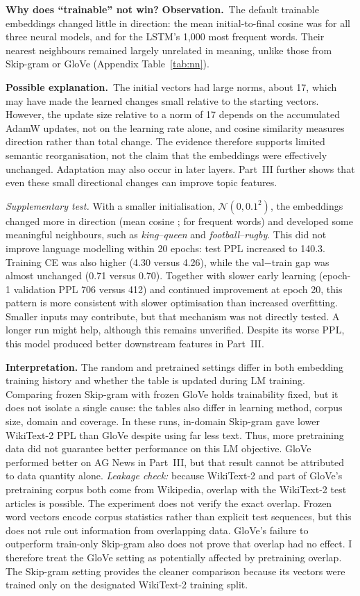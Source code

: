 \documentclass[10pt]{article}
\newcommand{\obs}{\textbf{Observation.}~}
\newcommand{\hyp}{\par\textbf{Possible explanation.}~}
\begin{document}
\textbf{Why does ``trainable'' not win?} \obs The default trainable embeddings changed little in direction: the mean
initial-to-final cosine was \driftlstm{} for all three neural models, and \drifttoplstm{} for the LSTM's 1,000 most
frequent words. Their nearest neighbours remained largely unrelated in meaning, unlike those from Skip-gram or GloVe
(Appendix Table~\ref{tab:nn}). \hyp The initial vectors had large norms, about 17, which may have made the learned
changes small relative to the starting vectors. However, the update size relative to a norm of 17 depends on the accumulated AdamW updates, not on the
learning rate alone, and cosine similarity measures direction rather than total change. The evidence therefore supports
limited semantic reorganisation, not the claim that the embeddings were effectively unchanged. Adaptation may also
occur in later layers. Part~III further shows that even these small directional changes can improve topic features.
\par\emph{Supplementary test.} With a smaller initialisation, $\mathcal N(0,0.1^2)$, the embeddings changed more in
direction (mean cosine \driftlstmsmall; \drifttoplstmsmall{} for frequent words) and developed some meaningful
neighbours, such as \emph{king}--\emph{queen} and \emph{football}--\emph{rugby}. This did not improve language
modelling within 20 epochs: test PPL increased to 140.3. Training CE was also higher (4.30 versus 4.26), while the
val$-$train gap was almost unchanged (0.71 versus 0.70). Together with slower early learning (epoch-1 validation PPL
706 versus 412) and continued improvement at epoch 20, this pattern is more consistent with slower optimisation than
increased overfitting. Smaller inputs may contribute, but that mechanism was not directly tested. A longer run might
help, although this remains unverified. Despite its worse PPL, this model produced better downstream features in
Part~III.

\textbf{Interpretation.} The random and pretrained settings differ in both embedding training history and whether
the table is updated during LM training. Comparing frozen Skip-gram with frozen GloVe holds trainability fixed, but
it does not isolate a single cause: the tables also differ in learning method, corpus size, domain and coverage. In
these runs, in-domain Skip-gram gave lower WikiText-2 PPL than GloVe despite using far less text. Thus, more
pretraining data did not guarantee better performance on this LM objective. GloVe performed better on AG News in
Part~III, but that result cannot be attributed to data quantity alone.
\emph{Leakage check:} because WikiText-2 and part of GloVe's pretraining corpus both come from Wikipedia, overlap
with the WikiText-2 test articles is possible. The experiment does not verify the exact overlap. Frozen word vectors
encode corpus statistics rather than explicit test sequences, but this does not rule out information from
overlapping data. GloVe's failure to outperform train-only Skip-gram also does not prove that overlap had no effect.
I therefore treat the GloVe setting as potentially affected by pretraining overlap. The Skip-gram setting provides
the cleaner comparison because its vectors were trained only on the designated WikiText-2 training split.
\end{document}

